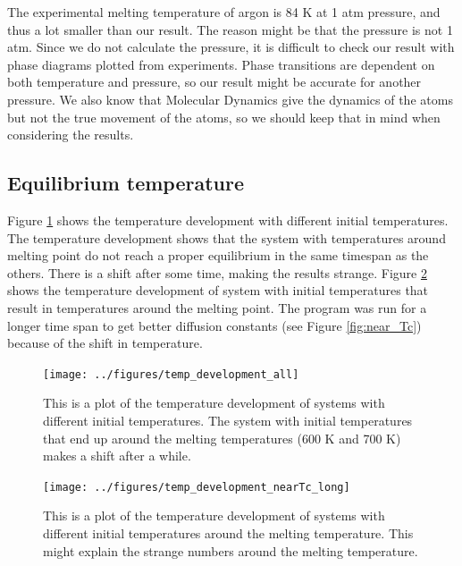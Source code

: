 The experimental melting temperature of argon is 84 K at 1 atm pressure, and thus a lot smaller than our result. The reason might be that the pressure is not 1 atm. Since we do not calculate the pressure, it is difficult to check our result with phase diagrams plotted from experiments. Phase transitions are dependent on both temperature and pressure, so our result might be accurate for another pressure. We also know that Molecular Dynamics give the dynamics of the atoms but not the true movement of the atoms, so we should keep that in mind when considering the results.

\subsection{Equilibrium temperature}

Figure \ref{fig:temp_development_all} shows the temperature development with different initial temperatures. The temperature development shows that the system with temperatures around melting point do not reach a proper equilibrium in the same timespan as the others. There is a shift after some time, making the results strange. Figure \ref{fig:temp_development_nearTc} shows the temperature development of system with initial temperatures that result in temperatures around the melting point. The program was run for a longer time span to get better diffusion constants (see Figure \ref{fig:near_Tc}) because of the shift in temperature.

\begin{figure}[H]
\center
\texttt{[image: ../figures/temp\_development\_all]}\caption{This is a plot of the temperature development of systems with different initial temperatures. The system with initial temperatures that end up around the melting temperatures (600 K and 700 K) makes a shift after a while.}\label{fig:temp_development_all}
\end{figure}

\begin{figure}[H]
\center
\texttt{[image: ../figures/temp\_development\_nearTc\_long]}\caption{This is a plot of the temperature development of systems with different initial temperatures around the melting temperature. This might explain the strange numbers around the melting temperature.}\label{fig:temp_development_nearTc}
\end{figure}
